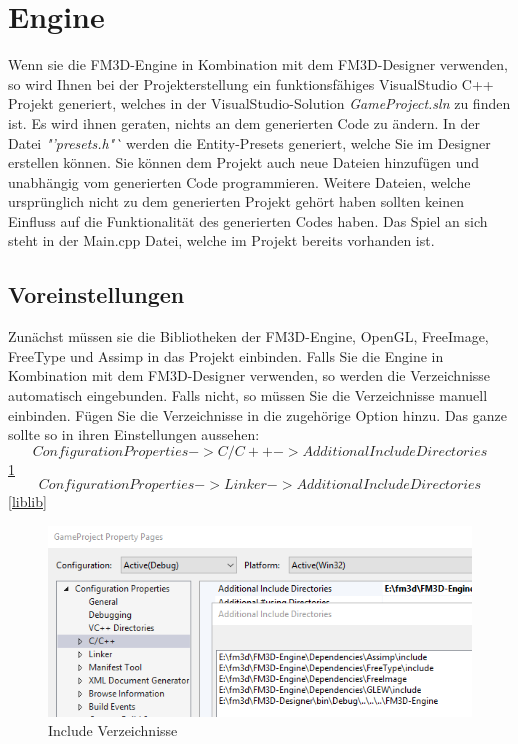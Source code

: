 \section{Engine}
\label{verwendung_engine}
Wenn sie die FM3D-Engine in Kombination mit dem FM3D-Designer verwenden, so wird Ihnen bei der Projekterstellung ein funktionsfähiges VisualStudio C++ Projekt generiert, welches in der VisualStudio-Solution \textit{GameProject.sln} zu finden ist.
Es wird ihnen geraten, nichts an dem generierten Code zu ändern.
In der Datei \textit{"'presets.h"`} werden die Entity-Presets generiert, welche Sie im Designer erstellen können.
Sie können dem Projekt auch neue Dateien hinzufügen und unabhängig vom generierten Code programmieren. Weitere Dateien, welche ursprünglich nicht zu dem generierten Projekt gehört haben sollten keinen Einfluss auf die Funktionalität des generierten Codes haben.
Das Spiel an sich steht in der Main.cpp Datei, welche im Projekt bereits vorhanden ist.

\subsection{Voreinstellungen}
Zunächst müssen sie die Bibliotheken der FM3D-Engine, OpenGL, FreeImage, FreeType und Assimp in das Projekt einbinden. Falls Sie die Engine in Kombination mit dem FM3D-Designer verwenden, so werden die Verzeichnisse automatisch eingebunden. Falls nicht, so müssen Sie die Verzeichnisse manuell einbinden. Fügen Sie die Verzeichnisse in die zugehörige Option hinzu. Das ganze sollte so in ihren Einstellungen aussehen:
$$Configuration Properties->C/C++->Additional Include Directories$$\cref{includeinc}
$$Configuration Properties->Linker->Additional Include Directories$$
\cref{liblib}

\begin{figure}
	\begin{center}
		\includegraphics[width=\textwidth]{04verwendung/Engine/include.png}
		\caption{Include Verzeichnisse}\label{includeinc}
	\end{center}
\end{figure}

